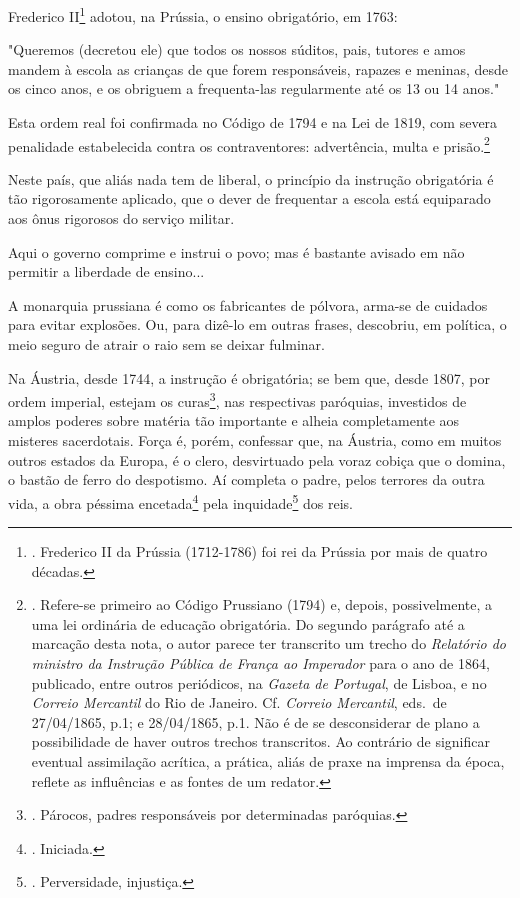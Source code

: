 Frederico II\footnote{. Frederico II da Prússia (1712-1786) foi rei da
  Prússia por mais de quatro décadas.} adotou, na Prússia, o ensino
obrigatório, em 1763:

"Queremos (decretou ele) que todos os nossos súditos, pais, tutores e
amos mandem à escola as crianças de que forem responsáveis, rapazes e
meninas, desde os cinco anos, e os obriguem a frequenta-las regularmente
até os 13 ou 14 anos."

Esta ordem real foi confirmada no Código de 1794 e na Lei de 1819, com
severa penalidade estabelecida contra os contraventores: advertência,
multa e prisão.\footnote{. Refere-se primeiro ao Código Prussiano (1794)
  e, depois, possivelmente, a uma lei ordinária de educação obrigatória.
  Do segundo parágrafo até a marcação desta nota, o autor parece ter
  transcrito um trecho do \emph{Relatório do ministro da Instrução
  Pública de França ao Imperador} para o ano de 1864, publicado, entre
  outros periódicos, na \emph{Gazeta de Portugal}, de Lisboa, e no
  \emph{Correio Mercantil} do Rio de Janeiro. Cf. \emph{Correio
  Mercantil}, eds.~de 27/04/1865, p.1; e 28/04/1865, p.1. Não é de se
  desconsiderar de plano a possibilidade de haver outros trechos
  transcritos. Ao contrário de significar eventual assimilação acrítica,
  a prática, aliás de praxe na imprensa da época, reflete as influências
  e as fontes de um redator.}

Neste país, que aliás nada tem de liberal, o princípio da instrução
obrigatória é tão rigorosamente aplicado, que o dever de frequentar a
escola está equiparado aos ônus rigorosos do serviço militar.

Aqui o governo comprime e instrui o povo; mas é bastante avisado em não
permitir a liberdade de ensino...

A monarquia prussiana é como os fabricantes de pólvora, arma-se de
cuidados para evitar explosões. Ou, para dizê-lo em outras frases,
descobriu, em política, o meio seguro de atrair o raio sem se deixar
fulminar.

Na Áustria, desde 1744, a instrução é obrigatória; se bem que, desde
1807, por ordem imperial, estejam os curas\footnote{. Párocos, padres
  responsáveis por determinadas paróquias.}, nas respectivas paróquias,
investidos de amplos poderes sobre matéria tão importante e alheia
completamente aos misteres sacerdotais. Força é, porém, confessar que,
na Áustria, como em muitos outros estados da Europa, é o clero,
desvirtuado pela voraz cobiça que o domina, o bastão de ferro do
despotismo. Aí completa o padre, pelos terrores da outra vida, a obra
péssima encetada\footnote{. Iniciada.} pela inquidade\footnote{.
  Perversidade, injustiça.} dos reis.

